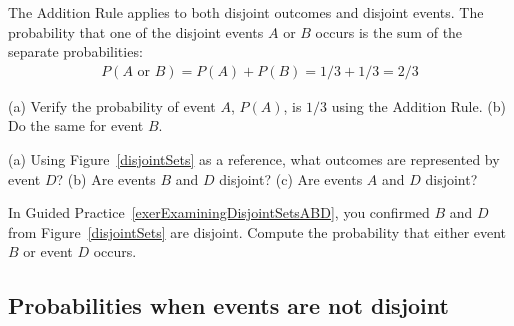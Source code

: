 The Addition Rule applies to both disjoint outcomes and disjoint events. The probability that one of the disjoint events $A$ or $B$ occurs is the sum of the separate probabilities:
\begin{eqnarray*}
P(A\text{ or }B) = P(A) + P(B) = 1/3 + 1/3 = 2/3
\end{eqnarray*}

\D{\newpage}

\begin{exercisewrap}
\begin{nexercise}
(a) Verify the probability of event $A$, $P(A)$, is $1/3$ using the Addition Rule. (b) Do the same for event $B$.\footnotemark
\end{nexercise}
\end{exercisewrap}

\begin{exercisewrap}
\begin{nexercise} \label{exerExaminingDisjointSetsABD}
(a) Using Figure~\ref{disjointSets} as a reference, what outcomes are represented by event $D$? (b) Are events $B$ and $D$ disjoint? (c) Are events $A$ and $D$ disjoint?\footnotemark
\end{nexercise}
\end{exercisewrap}

\begin{exercisewrap}
\begin{nexercise}
In Guided Practice~\ref{exerExaminingDisjointSetsABD}, you confirmed $B$ and $D$ from Figure~\ref{disjointSets} are disjoint. Compute the probability that either event $B$ or event $D$ occurs.\footnotemark
\end{nexercise}
\end{exercisewrap}


\subsection{Probabilities when events are not disjoint}

